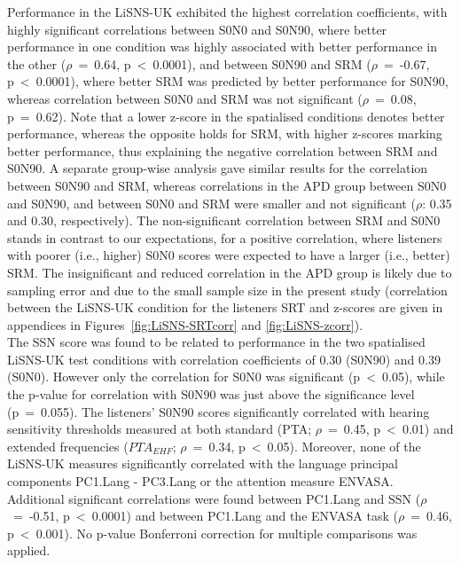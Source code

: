 \documentclass[a4paper, twoside]{templates/ociamthesis}
\begin{document}
Performance in the LiSNS-UK exhibited the highest correlation coefficients, with highly significant correlations between S0N0 and S0N90, where better performance in one condition was highly associated with better performance in the other (\(\rho\)~=~0.64, p~\textless~0.0001), and between S0N90 and SRM (\(\rho\)~=~-0.67, p~\textless~0.0001), where better SRM was predicted by better performance for S0N90, whereas correlation between S0N0 and SRM was not significant (\(\rho\)~=~0.08, p~=~0.62). Note that a lower z-score in the spatialised conditions denotes better performance, whereas the opposite holds for SRM, with higher z-scores marking better performance, thus explaining the negative correlation between SRM and S0N90. A separate group-wise analysis gave similar results for the correlation between S0N90 and SRM, whereas correlations in the APD group between S0N0 and S0N90, and between S0N0 and SRM were smaller and not significant (\(\rho\): 0.35 and 0.30, respectively). The non-significant correlation between SRM and S0N0 stands in contrast to our expectations, for a positive correlation, where listeners with poorer (i.e., higher) S0N0 scores were expected to have a larger (i.e., better) SRM. The insignificant and reduced correlation in the APD group is likely due to sampling error and due to the small sample size in the present study (correlation between the LiSNS-UK condition for the listeners SRT and z-scores are given in appendices in Figures~\ref{fig:LiSNS-SRTcorr} and \ref{fig:LiSNS-zcorr}).\\

The SSN score was found to be related to performance in the two spatialised LiSNS-UK test conditions with correlation coefficients of 0.30 (S0N90) and 0.39 (S0N0). However only the correlation for S0N0 was significant (p~\textless~0.05), while the p-value for correlation with S0N90 was just above the significance level (p~=~0.055). The listeners' S0N90 scores significantly correlated with hearing sensitivity thresholds measured at both standard (PTA; \(\rho\)~=~0.45, p~\textless~0.01) and extended frequencies (\(PTA_{EHF}\); \(\rho\)~=~0.34, p~\textless~0.05). Moreover, none of the LiSNS-UK measures significantly correlated with the language principal components PC1.Lang - PC3.Lang or the attention measure ENVASA. Additional significant correlations were found between PC1.Lang and SSN (\(\rho\)~=~-0.51, p~\textless~0.0001) and between PC1.Lang and the ENVASA task (\(\rho\)~=~0.46, p~\textless~0.001). No p-value Bonferroni correction for multiple comparisons was applied.
\end{document}
